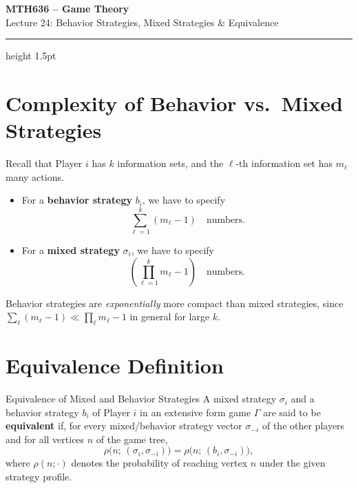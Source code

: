 \documentclass[12pt, a4paper]{article}
\begin{document}
\begin{center}
  {\LARGE\bfseries\sffamily\color{defblue} MTH636 -- Game Theory}\\[6pt]
  {\Large\sffamily Lecture 24: Behavior Strategies, Mixed Strategies \& Equivalence}\\[4pt]
\end{center}
\vspace{0.5cm}
\hrule height 1.5pt
\vspace{0.3cm}

\section{Complexity of Behavior vs.\ Mixed Strategies}

Recall that Player $i$ has $k$ information sets, and the $\ell$-th information set has $m_\ell$ many actions.

\begin{itemize}
  \item For a \textbf{behavior strategy} $b_i$, we have to specify
  \[
    \sum_{\ell=1}^{k}(m_\ell - 1) \quad \text{numbers.}
  \]

  \item For a \textbf{mixed strategy} $\sigma_i$, we have to specify
  \[
    \left(\prod_{\ell=1}^{k} m_\ell - 1\right) \quad \text{numbers.}
  \]
\end{itemize}

\begin{notebox}
  Behavior strategies are \emph{exponentially} more compact than mixed strategies, since
  $\sum_\ell (m_\ell-1) \ll \prod_\ell m_\ell - 1$ in general for large $k$.
\end{notebox}

\section{Equivalence Definition}

\begin{defbox}{Equivalence of Mixed and Behavior Strategies}
  A mixed strategy $\sigma_i$ and a behavior strategy $b_i$ of Player $i$ in an extensive form game $\Gamma$ are said to be \textbf{equivalent} if, for every mixed/behavior strategy vector $\sigma_{-i}$ of the other players and for all vertices $n$ of the game tree,
  \[
    \rho\bigl(n;\,(\sigma_i,\sigma_{-i})\bigr) = \rho\bigl(n;\,(b_i,\sigma_{-i})\bigr),
  \]
  where $\rho(n;\cdot)$ denotes the probability of reaching vertex $n$ under the given strategy profile.
\end{defbox}
\end{document}
